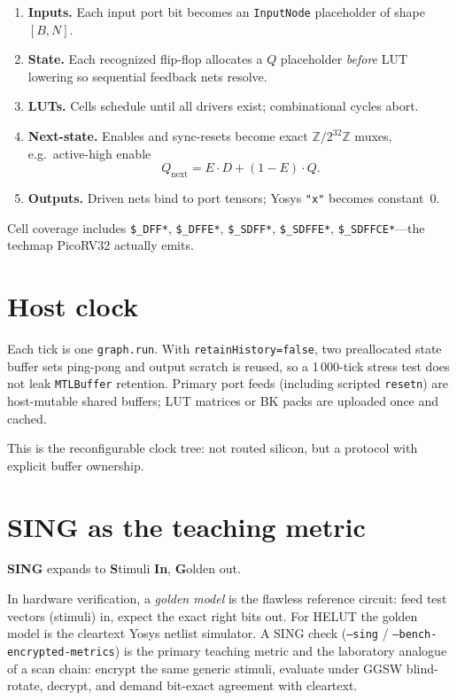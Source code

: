 \begin{enumerate}
  \item \textbf{Inputs.} Each input port bit becomes an \texttt{InputNode}
        placeholder of shape $[B,N]$.
  \item \textbf{State.} Each recognized flip-flop allocates a $Q$ placeholder
        \emph{before} LUT lowering so sequential feedback nets resolve.
  \item \textbf{LUTs.} Cells schedule until all drivers exist; combinational
        cycles abort.
  \item \textbf{Next-state.} Enables and sync-resets become exact
        $\mathbb{Z}/2^{32}\mathbb{Z}$ muxes, e.g.\ active-high enable
        \[
          Q_{\mathrm{next}} = E\cdot D + (1-E)\cdot Q.
        \]
  \item \textbf{Outputs.} Driven nets bind to port tensors; Yosys \texttt{"x"}
        becomes constant~0.
\end{enumerate}

Cell coverage includes \texttt{\$\_DFF*}, \texttt{\$\_DFFE*},
\texttt{\$\_SDFF*}, \texttt{\$\_SDFFE*}, \texttt{\$\_SDFFCE*}---the techmap
PicoRV32 actually emits.

\section{Host clock}

Each tick is one \texttt{graph.run}.
With \texttt{retainHistory=false}, two preallocated state buffer sets ping-pong
and output scratch is reused, so a 1\,000-tick stress test does not leak
\texttt{MTLBuffer} retention.
Primary port feeds (including scripted \texttt{resetn}) are host-mutable shared
buffers; LUT matrices or BK packs are uploaded once and cached.

This is the reconfigurable clock tree: not routed silicon, but a protocol
with explicit buffer ownership.

\section{SING as the teaching metric}
\label{sec:sing}

\textbf{SING} expands to \textbf{S}timuli \textbf{In}, \textbf{G}olden out.

In hardware verification, a \emph{golden model} is the flawless reference
circuit: feed test vectors (stimuli) in, expect the exact right bits out.
For HELUT the golden model is the cleartext Yosys netlist simulator.
A SING check (\texttt{--sing} / \texttt{--bench-encrypted-metrics}) is the
primary teaching metric and the laboratory analogue of a scan chain:
encrypt the same generic stimuli, evaluate under GGSW blind-rotate, decrypt,
and demand bit-exact agreement with cleartext.

